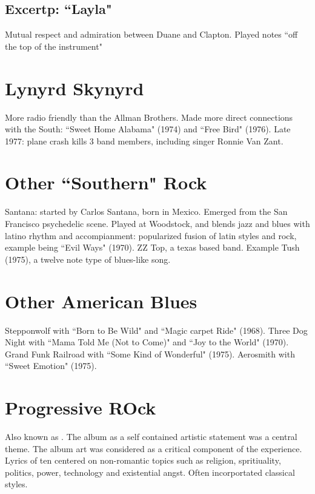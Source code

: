 \documentclass[12pt, a4paper, twoside, openright, titlepage]{book}
\begin{document}
\subsection{Excertp: ``Layla"}

Mutual respect and admiration between Duane and Clapton. Played notes ``off the top of the instrument"


\section{Lynyrd Skynyrd}

More radio friendly than the Allman Brothers. Made more direct connections with the South: ``Sweet Home Alabama" (1974) and ``Free Bird" (1976). Late 1977: plane crash kills 3 band members, including singer Ronnie Van Zant.


\section{Other ``Southern" Rock}

Santana: started by Carlos Santana, born in Mexico. Emerged from the San Francisco psychedelic scene. Played at Woodstock, and blends jazz and blues with latino rhythm and accompianment: popularized fusion of latin styles and rock, example being ``Evil Ways" (1970).  ZZ Top, a texas based band. Example Tush (1975), a twelve note type of blues-like song.


\section{Other American Blues}

Stepponwolf with ``Born to Be Wild" and ``Magic carpet Ride" (1968). Three Dog Night with ``Mama Told Me (Not to Come)" and ``Joy to the World" (1970). Grand Funk Railroad with ``Some Kind of Wonderful" (1975). Aerosmith with ``Sweet Emotion" (1975).


\section{Progressive ROck}


Also known as . The album as a self contained artistic statement was a central theme. The album art was considered as a critical component of the experience. Lyrics of ten centered on non-romantic topics such as religion, spritiuality, politics, power, technology and existential angst. Often incorportated classical styles. 
\end{document}

